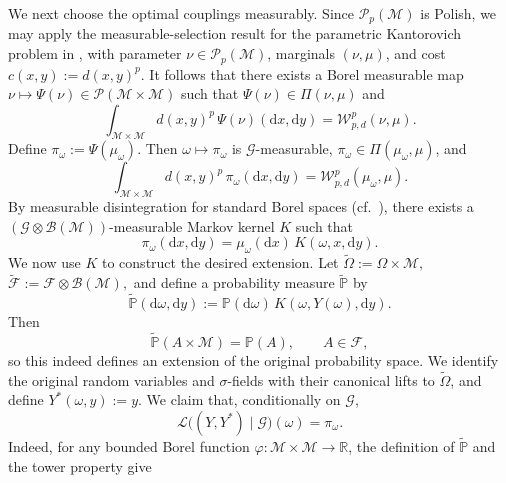 \documentclass[11pt,letterpaper]{article}
\theoremstyle{plain}
\theoremstyle{definition}
\theoremstyle{remark}
\newcommand{\W}{\mathcal{W}}
\begin{document}
We next choose the optimal couplings measurably. Since
$\mathcal P_p(\mathcal M)$ is Polish, we may apply the measurable-selection
result for the parametric Kantorovich problem in
\cite[Theorem~4.2]{bogachev2020kantorovich}, with parameter
$\nu\in\mathcal P_p(\mathcal M)$, marginals $(\nu,\mu)$, and cost $c(x,y):=d(x,y)^p.$ It follows that there exists a Borel measurable map $\nu
    \longmapsto
    \Psi(\nu)\in\mathcal P(\mathcal M\times\mathcal M)$ such that $\Psi(\nu)\in\Pi(\nu,\mu)$ and
\[
    \int_{\mathcal M\times\mathcal M}
    d(x,y)^p\,\Psi(\nu)(\mathrm dx,\mathrm dy)
    =
    \W_{p,d}^p(\nu,\mu).
\]
Define $\pi_\omega:=\Psi(\mu_\omega).$ Then $\omega\mapsto\pi_\omega$ is $\mathcal G$-measurable,
$\pi_\omega\in\Pi(\mu_\omega,\mu)$, and
\begin{equation}\label{eq:wp-decoupling-optimal}
    \int_{\mathcal M\times\mathcal M}
    d(x,y)^p\,\pi_\omega(\mathrm dx,\mathrm dy)
    =
    \W_{p,d}^p(\mu_\omega,\mu).
\end{equation}
By measurable disintegration for standard Borel spaces
(cf.\ \cite[Corollary~4.4]{bogachev2020kantorovich}), there exists a
$(\mathcal G\otimes\mathcal B(\mathcal M))$-measurable Markov kernel
$K$ such that
\begin{equation}\label{eq:wp-decoupling-disintegration}
    \pi_\omega(\mathrm dx,\mathrm dy)
    =
    \mu_\omega(\mathrm dx)\,
    K(\omega,x,\mathrm dy).
\end{equation}
We now use $K$ to construct the desired extension. Let $\widetilde\Omega:=\Omega\times\mathcal M,$ $\widetilde{\mathcal F}
    :=
    \mathcal F\otimes\mathcal B(\mathcal M),$ and define a probability measure $\widetilde{\mathbb P}$ by
\[
    \widetilde{\mathbb P}(\mathrm d\omega,\mathrm dy)
    :=
    \mathbb P(\mathrm d\omega)\,
    K(\omega,Y(\omega),\mathrm dy).
\]
Then
\[
    \widetilde{\mathbb P}(A\times\mathcal M)
    =
    \mathbb P(A),
    \qquad A\in\mathcal F,
\]
so this indeed defines an extension of the original probability space.
We identify the original random variables and $\sigma$-fields with their
canonical lifts to $\widetilde\Omega$, and define $ Y^*(\omega,y):=y.$ We claim that, conditionally on $\mathcal G$,
\begin{equation}\label{eq:conditional-optimal-coupling}
    \mathcal L\bigl((Y,Y^*)\mid\mathcal G\bigr)(\omega)
    =
    \pi_\omega.
\end{equation}
Indeed, for any bounded Borel function
$\varphi:\mathcal M\times\mathcal M\to\mathbb R$,
the definition of $\widetilde{\mathbb P}$ and the tower property give
\end{document}
